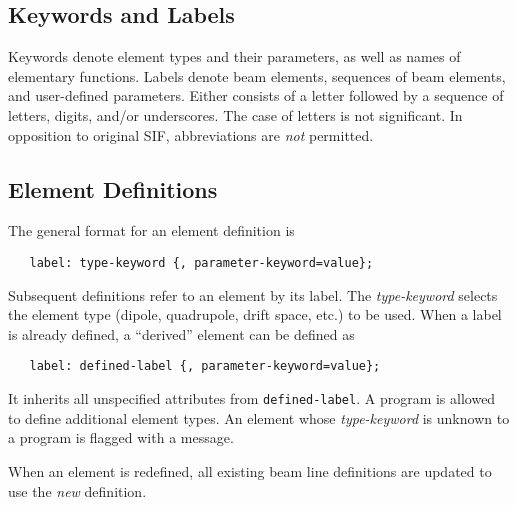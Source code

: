 \documentclass{article}
\begin{document}
\subsection{Keywords and Labels}
Keywords denote element types and their parameters,
as well as names of elementary functions.
Labels denote beam elements, sequences of beam elements, and
user-defined parameters.
Either consists of a letter followed by a sequence of letters, digits,
and/or underscores.
The case of letters is not significant.
In opposition to original SIF, abbreviations are {\em not} permitted.

\subsection{Element Definitions}
The general format for an element definition is
\begin{verbatim}
   label: type-keyword {, parameter-keyword=value};
\end{verbatim}
Subsequent definitions refer to an element by its label.
The {\em type-keyword} selects the element type (dipole, quadrupole,
drift space, etc.) to be used.
When a label is already defined, a ``derived'' element can be defined
as 
\begin{verbatim}
   label: defined-label {, parameter-keyword=value};
\end{verbatim}
It inherits all unspecified attributes from {\tt defined-label}.
A program is allowed to define additional element types.
An element whose {\em type-keyword} is unknown to a program is
flagged with a message.

When an element is redefined, all existing beam line definitions are
updated to use the {\em new} definition.
\end{document}
